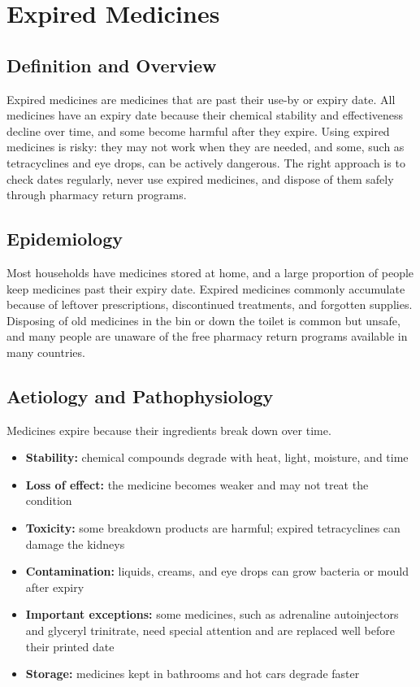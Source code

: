 \chapter{Expired Medicines}

\section*{Definition and Overview}
Expired medicines are medicines that are past their use-by or expiry date. All medicines have an expiry date because their chemical stability and effectiveness decline over time, and some become harmful after they expire. Using expired medicines is risky: they may not work when they are needed, and some, such as tetracyclines and eye drops, can be actively dangerous. The right approach is to check dates regularly, never use expired medicines, and dispose of them safely through pharmacy return programs.

\section*{Epidemiology}
Most households have medicines stored at home, and a large proportion of people keep medicines past their expiry date. Expired medicines commonly accumulate because of leftover prescriptions, discontinued treatments, and forgotten supplies. Disposing of old medicines in the bin or down the toilet is common but unsafe, and many people are unaware of the free pharmacy return programs available in many countries.

\section*{Aetiology and Pathophysiology}
Medicines expire because their ingredients break down over time.
\begin{itemize}
    \item \textbf{Stability:} chemical compounds degrade with heat, light, moisture, and time
    \item \textbf{Loss of effect:} the medicine becomes weaker and may not treat the condition
    \item \textbf{Toxicity:} some breakdown products are harmful; expired tetracyclines can damage the kidneys
    \item \textbf{Contamination:} liquids, creams, and eye drops can grow bacteria or mould after expiry
    \item \textbf{Important exceptions:} some medicines, such as adrenaline autoinjectors and glyceryl trinitrate, need special attention and are replaced well before their printed date
    \item \textbf{Storage:} medicines kept in bathrooms and hot cars degrade faster
\end{itemize}

